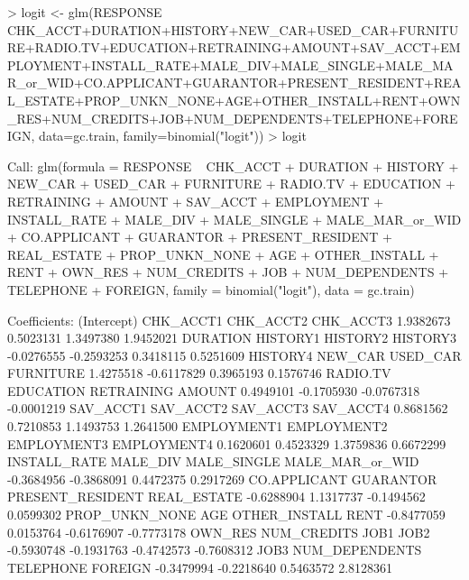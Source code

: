 \documentclass{article}
\begin{document}
\begin{Schunk}
\begin{Sinput}
> logit <- glm(RESPONSE ~ CHK_ACCT+DURATION+HISTORY+NEW_CAR+USED_CAR+FURNITURE+RADIO.TV+EDUCATION+RETRAINING+AMOUNT+SAV_ACCT+EMPLOYMENT+INSTALL_RATE+MALE_DIV+MALE_SINGLE+MALE_MAR_or_WID+CO.APPLICANT+GUARANTOR+PRESENT_RESIDENT+REAL_ESTATE+PROP_UNKN_NONE+AGE+OTHER_INSTALL+RENT+OWN_RES+NUM_CREDITS+JOB+NUM_DEPENDENTS+TELEPHONE+FOREIGN, data=gc.train, family=binomial("logit"))
> logit
\end{Sinput}
\begin{Soutput}
Call:  glm(formula = RESPONSE ~ CHK_ACCT + DURATION + HISTORY + NEW_CAR + 
    USED_CAR + FURNITURE + RADIO.TV + EDUCATION + RETRAINING + 
    AMOUNT + SAV_ACCT + EMPLOYMENT + INSTALL_RATE + MALE_DIV + 
    MALE_SINGLE + MALE_MAR_or_WID + CO.APPLICANT + GUARANTOR + 
    PRESENT_RESIDENT + REAL_ESTATE + PROP_UNKN_NONE + AGE + OTHER_INSTALL + 
    RENT + OWN_RES + NUM_CREDITS + JOB + NUM_DEPENDENTS + TELEPHONE + 
    FOREIGN, family = binomial("logit"), data = gc.train)

Coefficients:
     (Intercept)         CHK_ACCT1         CHK_ACCT2         CHK_ACCT3  
       1.9382673         0.5023131         1.3497380         1.9452021  
        DURATION          HISTORY1          HISTORY2          HISTORY3  
      -0.0276555        -0.2593253         0.3418115         0.5251609  
        HISTORY4           NEW_CAR          USED_CAR         FURNITURE  
       1.4275518        -0.6117829         0.3965193         0.1576746  
        RADIO.TV         EDUCATION        RETRAINING            AMOUNT  
       0.4949101        -0.1705930        -0.0767318        -0.0001219  
       SAV_ACCT1         SAV_ACCT2         SAV_ACCT3         SAV_ACCT4  
       0.8681562         0.7210853         1.1493753         1.2641500  
     EMPLOYMENT1       EMPLOYMENT2       EMPLOYMENT3       EMPLOYMENT4  
       0.1620601         0.4523329         1.3759836         0.6672299  
    INSTALL_RATE          MALE_DIV       MALE_SINGLE   MALE_MAR_or_WID  
      -0.3684956        -0.3868091         0.4472375         0.2917269  
    CO.APPLICANT         GUARANTOR  PRESENT_RESIDENT       REAL_ESTATE  
      -0.6288904         1.1317737        -0.1494562         0.0599302  
  PROP_UNKN_NONE               AGE     OTHER_INSTALL              RENT  
      -0.8477059         0.0153764        -0.6176907        -0.7773178  
         OWN_RES       NUM_CREDITS              JOB1              JOB2  
      -0.5930748        -0.1931763        -0.4742573        -0.7608312  
            JOB3    NUM_DEPENDENTS         TELEPHONE           FOREIGN  
      -0.3479994        -0.2218640         0.5463572         2.8128361  


\end{Soutput}
\end{Schunk}
\end{document}
